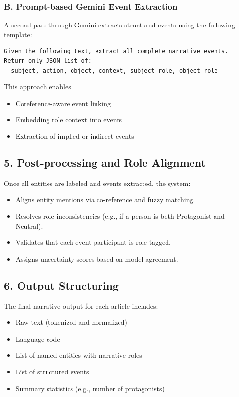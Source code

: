 \documentclass[12pt]{article}
\begin{document}
\subsubsection{B. Prompt-based Gemini Event Extraction}

A second pass through Gemini extracts structured events using the following template:

\begin{lstlisting}
Given the following text, extract all complete narrative events.
Return only JSON list of:
- subject, action, object, context, subject_role, object_role
\end{lstlisting}

This approach enables:
\begin{itemize}
    \item Coreference-aware event linking
    \item Embedding role context into events
    \item Extraction of implied or indirect events
\end{itemize}

\subsection{5. Post-processing and Role Alignment}

Once all entities are labeled and events extracted, the system:
\begin{itemize}
    \item Aligns entity mentions via co-reference and fuzzy matching.
    \item Resolves role inconsistencies (e.g., if a person is both Protagonist and Neutral).
    \item Validates that each event participant is role-tagged.
    \item Assigns uncertainty scores based on model agreement.
\end{itemize}

\subsection{6. Output Structuring}

The final narrative output for each article includes:
\begin{itemize}
    \item Raw text (tokenized and normalized)
    \item Language code
    \item List of named entities with narrative roles
    \item List of structured events
    \item Summary statistics (e.g., number of protagonists)
\end{itemize}
\end{document}
